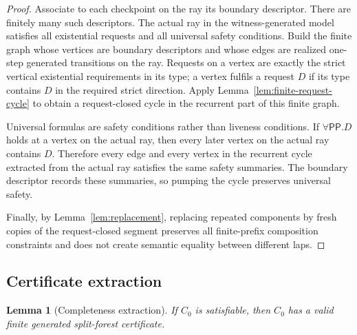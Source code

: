 \documentclass[11pt]{article}
\newtheorem{lemma}[theorem]{Lemma}
\newcommand{\PP}{\mathsf{PP}}
\begin{document}
\begin{proof}
Associate to each checkpoint on the ray its boundary descriptor.  There are finitely many such descriptors.  The actual ray in the witness-generated model satisfies all existential requests and all universal safety conditions.  Build the finite graph whose vertices are boundary descriptors and whose edges are realized one-step generated transitions on the ray.  Requests on a vertex are exactly the strict vertical existential requirements in its type; a vertex fulfils a request $D$ if its type contains $D$ in the required strict direction.  Apply Lemma~\ref{lem:finite-request-cycle} to obtain a request-closed cycle in the recurrent part of this finite graph.

Universal formulas are safety conditions rather than liveness conditions.  If $\forall\PP.D$ holds at a vertex on the actual ray, then every later vertex on the actual ray contains $D$.  Therefore every edge and every vertex in the recurrent cycle extracted from the actual ray satisfies the same safety summaries.  The boundary descriptor records these summaries, so pumping the cycle preserves universal safety.

Finally, by Lemma~\ref{lem:replacement}, replacing repeated components by fresh copies of the request-closed segment preserves all finite-prefix composition constraints and does not create semantic equality between different laps.
\end{proof}

\subsection{Certificate extraction}

\begin{lemma}[Completeness extraction]\label{lem:extraction}
If $C_0$ is satisfiable, then $C_0$ has a valid finite generated split-forest certificate.
\end{lemma}
\end{document}
